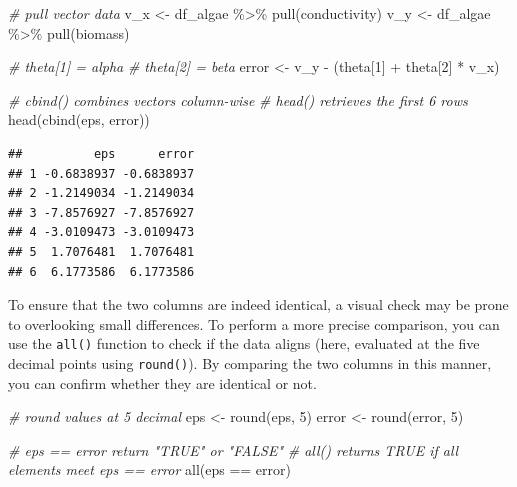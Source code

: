 \documentclass[
]{article}
\newenvironment{Shaded}{\begin{snugshade}}{\end{snugshade}}
\newcommand{\CommentTok}[1]{\textcolor[rgb]{0.56,0.35,0.01}{\textit{#1}}}
\newcommand{\DecValTok}[1]{\textcolor[rgb]{0.00,0.00,0.81}{#1}}
\newcommand{\FunctionTok}[1]{\textcolor[rgb]{0.00,0.00,0.00}{#1}}
\newcommand{\NormalTok}[1]{#1}
\newcommand{\OtherTok}[1]{\textcolor[rgb]{0.56,0.35,0.01}{#1}}
\newcommand{\SpecialCharTok}[1]{\textcolor[rgb]{0.00,0.00,0.00}{#1}}
\begin{document}
\begin{Shaded}
\begin{Highlighting}[]
\CommentTok{\# pull vector data}
\NormalTok{v\_x }\OtherTok{\textless{}{-}}\NormalTok{ df\_algae }\SpecialCharTok{\%\textgreater{}\%} \FunctionTok{pull}\NormalTok{(conductivity)}
\NormalTok{v\_y }\OtherTok{\textless{}{-}}\NormalTok{ df\_algae }\SpecialCharTok{\%\textgreater{}\%} \FunctionTok{pull}\NormalTok{(biomass)}

\CommentTok{\# theta[1] = alpha}
\CommentTok{\# theta[2] = beta}
\NormalTok{error }\OtherTok{\textless{}{-}}\NormalTok{ v\_y }\SpecialCharTok{{-}}\NormalTok{ (theta[}\DecValTok{1}\NormalTok{] }\SpecialCharTok{+}\NormalTok{ theta[}\DecValTok{2}\NormalTok{] }\SpecialCharTok{*}\NormalTok{ v\_x)}

\CommentTok{\# cbind() combines vectors column{-}wise}
\CommentTok{\# head() retrieves the first 6 rows}
\FunctionTok{head}\NormalTok{(}\FunctionTok{cbind}\NormalTok{(eps, error))}
\end{Highlighting}
\end{Shaded}

\begin{verbatim}
##          eps      error
## 1 -0.6838937 -0.6838937
## 2 -1.2149034 -1.2149034
## 3 -7.8576927 -7.8576927
## 4 -3.0109473 -3.0109473
## 5  1.7076481  1.7076481
## 6  6.1773586  6.1773586
\end{verbatim}

To ensure that the two columns are indeed identical, a visual check may be prone to overlooking small differences. To perform a more precise comparison, you can use the \texttt{all()} function to check if the data aligns (here, evaluated at the five decimal points using \texttt{round()}). By comparing the two columns in this manner, you can confirm whether they are identical or not.

\begin{Shaded}
\begin{Highlighting}[]
\CommentTok{\# round values at 5 decimal}
\NormalTok{eps }\OtherTok{\textless{}{-}} \FunctionTok{round}\NormalTok{(eps, }\DecValTok{5}\NormalTok{)}
\NormalTok{error }\OtherTok{\textless{}{-}} \FunctionTok{round}\NormalTok{(error, }\DecValTok{5}\NormalTok{)}

\CommentTok{\# eps == error return "TRUE" or "FALSE"}
\CommentTok{\# all() returns TRUE if all elements meet eps == error}
\FunctionTok{all}\NormalTok{(eps }\SpecialCharTok{==}\NormalTok{ error)}
\end{Highlighting}
\end{Shaded}
\end{document}
